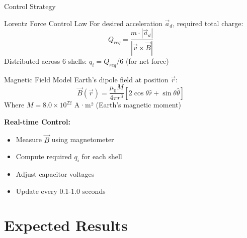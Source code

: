 \documentclass[aspectratio=169]{beamer}
\begin{document}
\begin{frame}{Control Strategy}
\begin{block}{Lorentz Force Control Law}
For desired acceleration $\vec{a}_d$, required total charge:
\begin{equation}
Q_{req} = \frac{m \cdot |\vec{a}_d|}{|\vec{v} \times \vec{B}|}
\end{equation}
Distributed across 6 shells: $q_i = Q_{req}/6$ (for net force)
\end{block}

\begin{block}{Magnetic Field Model}
Earth's dipole field at position $\vec{r}$:
\begin{equation}
\vec{B}(\vec{r}) = \frac{\mu_0 M}{4\pi r^3}[2\cos\theta \hat{r} + \sin\theta \hat{\theta}]
\end{equation}
Where $M = 8.0 \times 10^{22}$ A·m² (Earth's magnetic moment)
\end{block}

\textbf{Real-time Control:}
\begin{itemize}
    \item Measure $\vec{B}$ using magnetometer
    \item Compute required $q_i$ for each shell
    \item Adjust capacitor voltages
    \item Update every 0.1-1.0 seconds
\end{itemize}
\end{frame}

\section{Expected Results}
\end{document}
